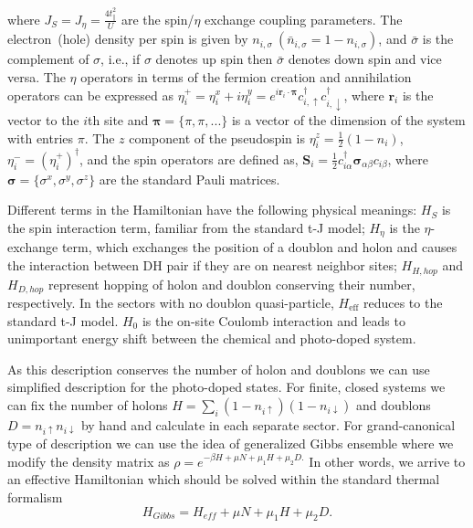 \documentclass[aps,prb,twocolumn,floats,superscriptaddress,epsfig]{revtex4-1}
\begin{document}
where $J_{S} = J_{\eta} = \frac{4t_\parallel^2}{U}$  are the spin/$\eta$ exchange coupling parameters.  The electron~(hole) density per spin is given by 
$n_{i,\sigma}~(\bar{n}_{i,\sigma}=1-n_{i,\sigma})$, and $\bar{\sigma}$ is the complement of $\sigma$, i.e., if $\sigma$ denotes up spin then $\bar{\sigma}$ denotes down spin and vice versa. The $\eta$ operators in terms of the fermion creation and annihilation operators can be expressed as $\eta_i^{+}=\eta_i^x+ i \eta_i^y= e^{i\boldsymbol{r}_i\cdot\boldsymbol{\pi}} c_{i,\uparrow}^{\dagger}c_{i,\downarrow}^{\dagger}$, where $\boldsymbol{r}_i$ is the vector to the $i$th site and $\boldsymbol{\pi}=\{\pi, \pi, ...\}$ is a vector of the dimension of the system with entries $\pi$. The $z$ component of the pseudospin is $\eta_i^z=\frac{1}{2}(1-n_i)$, $\eta_i^- = (\eta_i^{+})^{\dagger}$,  and the spin operators are defined as, $ \boldsymbol{S}_i= \frac{1}{2} c_{i \alpha}^{\dagger} \boldsymbol{\sigma}_{\alpha \beta} c_{i \beta}$, where $\boldsymbol{\sigma} = \{\sigma^x,\sigma^y,\sigma^z\}$ are  the standard Pauli matrices.

Different terms in the Hamiltonian have the following physical meanings:  $H_{S}$ is the spin interaction term, familiar from the standard t-J model; $H_{\eta}$ is the $\eta$-exchange term, which exchanges the position of a doublon and holon and causes the interaction between DH pair if they are on nearest neighbor sites; $H_{H,hop}$ and $H_{D,hop}$ represent hopping of holon and doublon conserving their number, respectively.  In the sectors with no doublon quasi-particle, $H_{\text{eff}}$ reduces to the standard t-J model. $H_0$ is the on-site Coulomb interaction and leads to unimportant energy shift between the chemical and photo-doped system. 


As this description conserves the number of holon and doublons we can use simplified description for the photo-doped states. For finite, closed systems 
we can fix the number of holons $H=\sum_i (1-n_{i\uparrow}) (1-n_{i\downarrow})$ and doublons $D=n_{i\uparrow}n_{i\downarrow}$ by hand and 
calculate in each separate sector. For grand-canonical type of description we can use the idea of generalized Gibbs ensemble where we modify the density matrix as
$\rho=e^{-\beta H +\mu N + \mu_1 H + \mu_2 D.}$ In other words, we arrive to an effective Hamiltonian which should be solved within the standard thermal formalism 
$$H_{Gibbs}=H_{eff}+\mu N + \mu_1 H + \mu_2 D.$$



\end{document}

